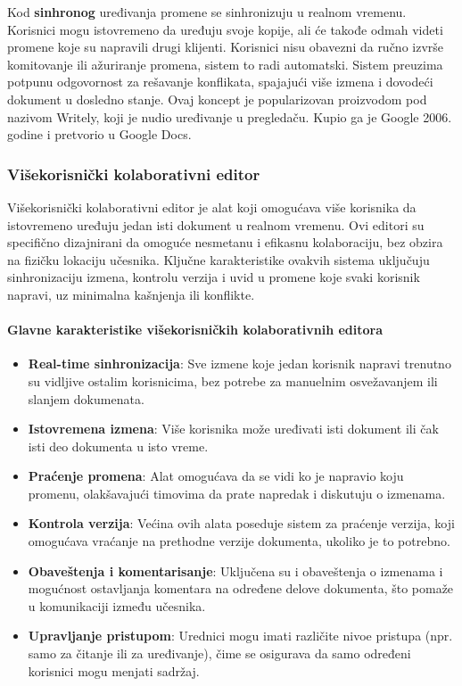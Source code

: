 \documentclass[12pt]{article}
\begin{document}
    Kod \textbf{sinhronog} uređivanja promene se sinhronizuju u realnom vremenu. Korisnici mogu istovremeno da uređuju svoje kopije, ali će takođe odmah videti promene koje su napravili drugi klijenti. Korisnici nisu obavezni da ručno izvrše komitovanje ili ažuriranje promena, sistem to radi automatski. Sistem preuzima potpunu odgovornost za rešavanje konflikata, spajajući više izmena i dovodeći dokument u dosledno stanje. Ovaj koncept je popularizovan proizvodom pod nazivom Writely, koji je nudio uređivanje u pregledaču. Kupio ga je Google 2006. godine i pretvorio u Google Docs.
    
   \subsubsection{Višekorisnički kolaborativni editor}

   Višekorisnički kolaborativni editor je alat koji omogućava više korisnika da istovremeno uređuju jedan isti dokument u realnom vremenu. Ovi editori su specifično dizajnirani da omoguće nesmetanu i efikasnu kolaboraciju, bez obzira na fizičku lokaciju učesnika. Ključne karakteristike ovakvih sistema uključuju sinhronizaciju izmena, kontrolu verzija i uvid u promene koje svaki korisnik napravi, uz minimalna kašnjenja ili konflikte.

    \paragraph {Glavne karakteristike višekorisničkih kolaborativnih editora}
    
    \begin{itemize}
        \item \textbf{Real-time sinhronizacija}: Sve izmene koje jedan korisnik napravi trenutno su vidljive ostalim korisnicima, bez potrebe za manuelnim osvežavanjem ili slanjem dokumenata.
        \item \textbf{Istovremena izmena}: Više korisnika može uređivati isti dokument ili čak isti deo dokumenta u isto vreme.
        \item \textbf{Praćenje promena}: Alat omogućava da se vidi ko je napravio koju promenu, olakšavajući timovima da prate napredak i diskutuju o izmenama.
        \item \textbf{Kontrola verzija}: Većina ovih alata poseduje sistem za praćenje verzija, koji omogućava vraćanje na prethodne verzije dokumenta, ukoliko je to potrebno.
        \item \textbf{Obaveštenja i komentarisanje}: Uključena su i obaveštenja o izmenama i mogućnost ostavljanja komentara na određene delove dokumenta, što pomaže u komunikaciji između učesnika.
        \item \textbf{Upravljanje pristupom}: Urednici mogu imati različite nivoe pristupa (npr. samo za čitanje ili za uređivanje), čime se osigurava da samo određeni korisnici mogu menjati sadržaj.
    \end{itemize}
\end{document}
